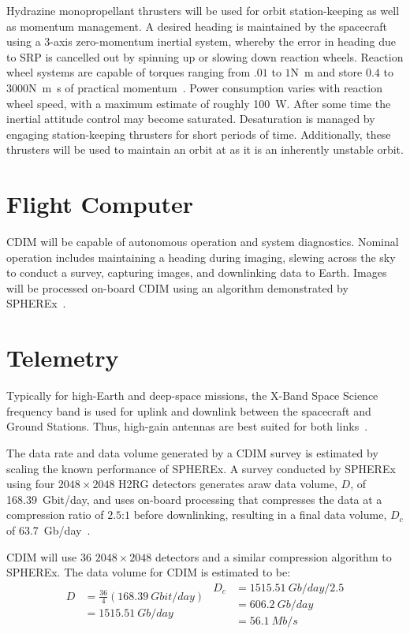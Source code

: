 \documentclass{ws-jai}
\begin{document}
Hydrazine monopropellant thrusters will be used for orbit station-keeping as well as momentum management.
A desired heading is maintained by the spacecraft using a 3-axis zero-momentum inertial system, whereby the error in heading due to SRP is cancelled out by spinning up or slowing down reaction wheels.
Reaction wheel systems are capable of torques ranging from $.01$ to $1$\si{\newton\meter} and store $0.4$ to $3000$\si{\newton\meter\second} of practical momentum~\cite{smad2015}.
Power consumption varies with reaction wheel speed, with a maximum estimate of roughly \SI{100}{\watt}.
After some time the inertial attitude control may become saturated.
Desaturation is managed by engaging station-keeping thrusters for short periods of time.
Additionally, these thrusters will be used to maintain an orbit at \Ltwo{} as it is an inherently unstable orbit.

\section{Flight Computer}
CDIM will be capable of autonomous operation and system diagnostics.
Nominal operation includes maintaining a heading during imaging, slewing across the sky to conduct a survey, capturing images, and downlinking data to Earth.
Images will be processed on-board CDIM using an algorithm demonstrated by SPHEREx~\cite{spherexTelemetry2016}.

\section{Telemetry}
\label{sec:telemetry}
Typically for high-Earth and deep-space missions, the X-Band Space Science frequency band is used for uplink and downlink between the spacecraft and Ground Stations.
Thus, high-gain antennas are best suited for both links~\cite{smad2015}.

The data rate and data volume generated by a CDIM survey is estimated by scaling the known performance of SPHEREx.
A survey conducted by SPHEREx using four $2048\times2048$ H2RG detectors generates araw data volume, $D$, of \SI{168.39}{Gbit/day}, and uses on-board processing that compresses the data at a compression ratio of $2.5$:$1$ before downlinking, resulting in a final data volume, $D_c$ of \SI{63.7}{Gb/day}~\cite{spherexTelemetry2016}.

CDIM will use 36 $2048\times2048$ detectors and a similar compression algorithm to SPHEREx.
The data volume for CDIM is estimated to be:
\begin{equation}\label{eq:telemetry}
  \begin{split}
    D &= \frac{36}{4} (\SI{168.39}{Gbit/day}) \\
    &= \SI{1515.51}{Gb/day}
  \end{split}
  \begin{split}
    D_c &= \SI{1515.51}{Gb/day}/2.5 \\
    &= \SI{606.2}{Gb/day} \\
    &= \SI{56.1}{Mb/s}
  \end{split}
\end{equation}
\end{document}
